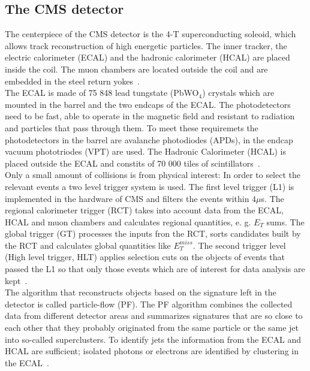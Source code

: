 \subsection{The CMS detector}
\label{sec:cms_det}

The centerpiece of the CMS detector is the 4-T superconducting soleoid, which allows track reconstruction of high energetic particles. The inner tracker,
the electric calorimeter (ECAL) and the hadronic calorimeter (HCAL) are placed inside the coil. The muon chambers are located outside the coil and are embedded in the steel return yokes~\cite{CMS:2008}. \\

The ECAL is made of 75 848 lead tungstate (PbWO$_4$) crystals which are mounted in the barrel and the two endcaps of the ECAL. The photodetectors need to be fast, able to operate in the magnetic field and
resistant to radiation and particles that pass through them. To meet these requiremets the photodetectors in the barrel are avalanche photodiodes (APDs), in the endcap vacuum phototriodes (VPT) are used.
The Hadronic Calorimeter (HCAL) is placed outside the ECAL and constits of 70 000 tiles of scintillators~\cite{CMS:2008}. \\

Only a small amount of collisions is from physical interest: In order to select the relevant events a two level trigger system is used. The first level trigger (L1) is implemented in the hardware of CMS and filters the events
within $4 \mu$s. The regional calorimeter trigger (RCT) takes into account data from the ECAL, HCAL and muon chambers and calculates regional quantities, e. g. $E_T$ sums. The global trigger (GT) processes the inputs fron the RCT,
sorts candidates built by the RCT and calculates global quantities like $E_T^{miss}$. The second trigger level (High level trigger, HLT) applies selection cuts on the objects of events that passed the L1 so that only those events which
are of interest for data analysis are kept~\cite{CMS:2017trg}. \\

The algorithm that reconstructs objects based on the signature left in the detector is called particle-flow (PF). The PF algorithm combines the collected data from different detector areas and summarizes signatures that are so close to
each other that they probably originated from the same particle or the same jet into so-called superclusters. To identify jets the information from the ECAL and HCAL are sufficient; isolated photons or electrons are identified by clustering in the ECAL~\cite{CMS:2017pf}.



